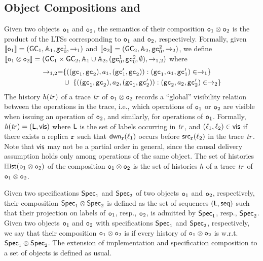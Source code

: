 \subsection{Object Compositions and \CRDTLin{}}\label{ssec:comp_intro}

Given two objects $\mathtt{o}_1$ and $\mathtt{o}_2$, the semantics of their composition $\mathtt{o}_1\otimes \mathtt{o}_2$ is the product of the LTSs corresponding to $\mathtt{o}_1$ and $\mathtt{o}_2$, respectively. Formally, given $\llbracket \mathtt{o}_1 \rrbracket =(\mathsf{GC}_1,\mathbb{A}_1,\mathtt{gc}_0^1,\rightarrow_1)$ and $\llbracket \mathtt{o}_2 \rrbracket =(\mathsf{GC}_2,\mathbb{A}_2,\mathtt{gc}_0^2,\rightarrow_2)$, we define $\llbracket \mathtt{o}_1\otimes \mathtt{o}_2 \rrbracket =(\mathsf{GC}_1\times \mathsf{GC}_2,\mathbb{A}_1\cup \mathbb{A}_2,(\mathtt{gc}_0^1,\mathtt{gc}_0^2,\emptyset),\rightarrow_{1,2})$ where
\begin{align*}
\rightarrow_{1,2} = & \{ ((\mathtt{gc}_1,\mathtt{gc}_2),a_1,(\mathtt{gc}_1',\mathtt{gc}_2)): (\mathtt{gc}_1,a_1,\mathtt{gc}_1')\in\rightarrow_1\} \\
& \cup\ \{ ((\mathtt{gc}_1,\mathtt{gc}_2),a_2,(\mathtt{gc}_1,\mathtt{gc}_2')): (\mathtt{gc}_2,a_2,\mathtt{gc}_2')\in\rightarrow_2\}
\end{align*}
The history $\mathit{h}({\mathit{tr})}$ of a trace $\mathit{tr}$ of $\mathtt{o}_1\otimes \mathtt{o}_2$ records a ``global'' visibility relation between the operations in the trace, i.e., which operations of $\mathtt{o}_1$ or $\mathtt{o}_2$ are visible when issuing an operation of $\mathtt{o}_2$, and similarly, for operations of $\mathtt{o}_1$. Formally, $\mathit{h}({\mathit{tr})}=(\mathsf{L}, \mathsf{vis})$ where $\mathsf{L}$ is the set of labels occurring in $\mathit{tr}$, and $(\ell_1,\ell_2)\in\mathsf{vis}$ if there exists a replica $\mathtt{r}$ such that $\mathsf{dwn}_{\mathtt{r}}(\ell_1)$ occurs before $\mathsf{src}_{\mathtt{r}}(\ell_2)$ in the trace $\mathit{tr}$. Note that $\mathsf{vis}$ may not be a partial order in general, since the causal delivery assumption holds only among operations of the same object. The set of histories $\mathbb{H}\mathsf{ist}(\mathtt{o}_1\otimes \mathtt{o}_2)$ of the composition $\mathtt{o}_1\otimes \mathtt{o}_2$ is the set of histories $h$ of a trace $\mathit{tr}$ of $\mathtt{o}_1\otimes \mathtt{o}_2$.

Given two specifications $\mathsf{Spec}_1$ and $\mathsf{Spec}_2$ of two objects $\mathtt{o}_1$ and $\mathtt{o}_2$, respectively, their composition $\mathsf{Spec}_1\otimes \mathsf{Spec}_2$ is defined as the set of sequences $(\mathsf{L},\mathsf{seq})$ such that their projection on labels of $\mathtt{o}_1$, resp., $\mathtt{o}_2$, is admitted by $\mathsf{Spec}_1$, resp., $\mathsf{Spec}_2$. Given two objects  $\mathtt{o}_1$ and $\mathtt{o}_2$ with specifications $\mathsf{Spec}_1$ and $\mathsf{Spec}_2$, respectively, we say that their composition $\mathtt{o}_1\otimes \mathtt{o}_2$ is \emph{\crdtlinearizable{}} if every history of $\mathtt{o}_1\otimes \mathtt{o}_2$ is \crdtlinearizable{} w.r.t. $\mathsf{Spec}_1\otimes \mathsf{Spec}_2$. The extension of implementation and specification composition to a set of objects is defined as usual.

